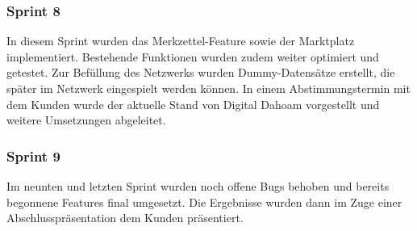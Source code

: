 \subsubsection{Sprint 8}
In diesem Sprint wurden das Merkzettel-Feature sowie der Marktplatz implementiert. Bestehende Funktionen wurden zudem weiter optimiert und getestet. Zur Befüllung des Netzwerks wurden Dummy-Datensätze erstellt, die später im Netzwerk eingespielt werden können. In einem Abstimmungstermin mit dem Kunden wurde der aktuelle Stand von Digital Dahoam vorgestellt und weitere Umsetzungen abgeleitet.

\subsubsection{Sprint 9}
Im neunten und letzten Sprint wurden noch offene Bugs behoben und bereits begonnene Features final umgesetzt. Die Ergebnisse wurden dann im Zuge einer Abschlusspräsentation dem Kunden präsentiert. 
